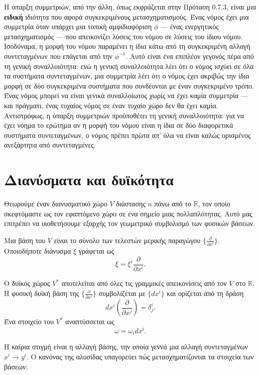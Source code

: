 \documentclass[12pt]{article}
\begin{document}
Η ύπαρξη συμμετριών, από την άλλη, όπως εκφράζεται στην Πρόταση 0.7.3, είναι μια \textbf{ειδική} ιδιότητα που αφορά συγκεκριμένους μετασχηματισμούς. Ένας νόμος έχει μια συμμετρία όταν υπάρχει μια τοπική αμφιδιαφόριση $\phi$ — ένας ενεργητικός μετασχηματισμός — που απεικονίζει λύσεις του νόμου σε λύσεις του ίδιου νόμου. Ισοδύναμα, η μορφή του νόμου παραμένει η ίδια κάτω από τη συγκεκριμένη αλλαγή συντεταγμένων που επάγεται από την $\phi^{-1}$. Αυτό είναι ένα επιπλέον γεγονός πέρα από τη γενική συναλλοιότητα: ενώ η γενική συναλλοιότητα λέει ότι ο νόμος ισχύει σε όλα τα συστήματα συντεταγμένων, μια συμμετρία λέει ότι ο νόμος έχει ακριβώς την ίδια μορφή σε δύο συγκεκριμένα συστήματα που συνδέονται με έναν συγκεκριμένο τρόπο. Ένας νόμος μπορεί να είναι γενικά συναλλοίωτος χωρίς να έχει καμία συμμετρία — και πράγματι, ένας τυχαίος νόμος σε έναν τυχαίο χώρο δεν θα έχει καμία. Αντιστρόφως, η ύπαρξη συμμετριών προϋποθέτει τη γενική συναλλοιότητα: για να έχει νόημα το ερώτημα αν η μορφή του νόμου είναι η ίδια σε δύο διαφορετικά συστήματα συντεταγμένων, ο νόμος πρέπει πρώτα απ' όλα να είναι καλώς ορισμένος ανεξάρτητα από συντεταγμένες.

\section{Διανύσματα και δυϊκότητα}

Θεωρούμε έναν διανυσματικό χώρο \( V \) διάστασης \( n \) πάνω από το \( \mathbb{R} \), τον οποίο σκεφτόμαστε ως τον εφαπτόμενο χώρο σε ένα σημείο μιας πολλαπλότητας. Αυτό μας επιτρέπει να υιοθετήσουμε εξαρχής τον γεωμετρικό συμβολισμό των φυσικών βάσεων.

Μια βάση του \( V \) είναι το σύνολο των τελεστών μερικής παραγώγου \( \{ \frac{\partial}{\partial x^i} \} \). Οποιοδήποτε διάνυσμα \( \xi \) γράφεται ως
\[
\xi = \xi^i \frac{\partial}{\partial x^i}. \tag{1}
\]

Ο δυϊκός χώρος \( V^* \) αποτελείται από όλες τις γραμμικές απεικονίσεις από τον \( V \) στο \( \mathbb{R} \). Η φυσική δυϊκή βάση της \( \{ \frac{\partial}{\partial x^i} \} \) συμβολίζεται με \( \{ dx^i \} \) και ορίζεται από τη δράση
\[
dx^i \left( \frac{\partial}{\partial x^j} \right) = \delta^i_j. \tag{2}
\]
Ένα στοιχείο του \( V^* \) αναπτύσσεται ως
\[
\omega = \omega_i dx^i. \tag{3}
\]

Η καίρια στιγμή είναι η αλλαγή βάσης, την οποία γεννά μια αλλαγή συντεταγμένων \( x^i \to y^i \). Ο κανόνας της αλυσίδας υπαγορεύει πώς μετασχηματίζονται τα στοιχεία των βάσεων:
\end{document}
